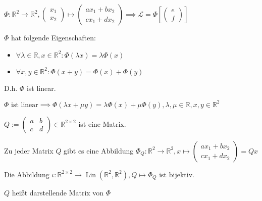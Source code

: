 \begin{proposition}
  $\Phi: \mathbb{R}^2 \to \mathbb{R}^2,
  \begin{pmatrix}
    x_1\\x_2
  \end{pmatrix}
  \mapsto
  \begin{pmatrix}
    ax_1 + bx_2\\ cx_1+dx_2
  \end{pmatrix}
  \implies \mathscr{L} = \Phi \left[
    \begin{pmatrix}
      e\\f
    \end{pmatrix}
  \right]
  $

  $\Phi$ hat folgende Eigenschaften:
  \begin{itemize}
  \item $\forall \lambda \in \mathbb{R}, x \in \mathbb{R}^2: \Phi(\lambda x) = \lambda \Phi(x)$
  \item $\forall x, y \in \mathbb{R}^2: \Phi(x + y) = \Phi(x) + \Phi(y)$
  \end{itemize}

  D.h. $\Phi$ ist linear.
\end{proposition}
\begin{remark}
  $\Phi \text{ ist linear} \implies \Phi(\lambda x + \mu y) = \lambda \Phi(x) + \mu \Phi (y), \lambda, \mu \in \mathbb{R}, x, y \in \mathbb{R}^2$
\end{remark}
\begin{notation}
  $Q:=
  \begin{pmatrix}
    a&b\\c&d
  \end{pmatrix}
  \in \mathbb{R}^{2 \times 2}$ ist eine Matrix.

  Zu jeder Matrix $Q$ gibt es eine Abbildung $\Phi_Q: \mathbb{R}^2 \to \mathbb{R}^2,
  x \mapsto
  \begin{pmatrix}
    ax_1 + bx_2 \\ cx_1+ dx_2
  \end{pmatrix}
  = Qx
  $
\end{notation}
\begin{theorem}
  Die Abbildung $\iota: \mathbb{R}^{2 \times 2} \to \operatorname{Lin}(\mathbb{R}^2, \mathbb{R}^2), Q \mapsto \Phi_Q$ ist bijektiv.
\end{theorem}
\begin{remark}
  $Q$ heißt darstellende Matrix von $\Phi$
\end{remark}


